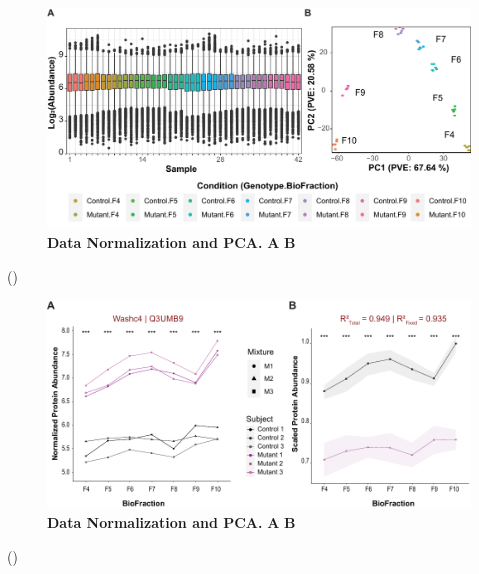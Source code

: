 \documentclass[12pt]{elife}\usepackage[]{graphicx}\usepackage[]{color}
\begin{document}
\begin{figure}[h] %
  \begin{fullwidth}
  \begin{center}
	  \includegraphics[width=0.9\paperwidth,keepaspectratio]{normalization}
	  \caption{\textbf{Data Normalization and PCA.} \textbf{A} \textbf{B} }
	  \label{fig:normalization}
  \end{center}
  \end{fullwidth}
\end{figure}


()


\begin{figure}[h] %
  \begin{fullwidth}
  \begin{center}
	  \includegraphics[width=0.9\paperwidth,keepaspectratio]{washc4}
	  \caption{\textbf{Data Normalization and PCA.} \textbf{A} \textbf{B} }
	  \label{fig:washc4}
  \end{center}
  \end{fullwidth}
\end{figure}


()
\end{document}
